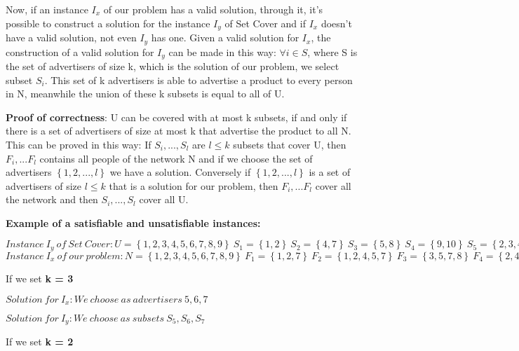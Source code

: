 \documentclass{article}
\begin{document}
Now, if an instance $I_{x}$ of our problem has a valid solution, through it, it's possible to construct a solution for the instance $I_{y}$ of Set Cover and if $I_{x}$ doesn't have a valid solution, not even $I_{y}$ has one.
Given a valid solution for  $I_{x}$, the construction of a valid solution for $I_{y}$ can be made in this way:
$\forall i\in S$, where S is the set of advertisers of size k, which is the solution of our problem, we select subset $S_{i}$. This set of k advertisers is able to advertise a product to every person in N, meanwhile the union of these k subsets is equal to all of U.

\textbf{Proof of correctness}:
U can be covered with at most k subsets, if and only if  there is a set of advertisers of size at most k that advertise the product to all N. This can be proved in this way: If $S_{i}, ... , S_{l}$ are $l \le k$ subsets that cover U, then $F_{i}, ... F_{l}$ contains all people of the network N and if we choose the set of advertisers  $\left \{1, 2, ..., l  \right \}$ we have a solution. Conversely if  $\left \{1, 2, ..., l  \right \}$ is a set of advertisers of size $ l \le k $ that is a solution for our problem, then $F_{i}, ... F_{l}$ cover all the network and then $S_{i}, ... , S_{l}$ cover all U.


\textbf{Example of a satisfiable and unsatisfiable instances:}

$Instance\ I_{y} \ of \ Set \ Cover:  
U = \left \{1,2,3,4,5,6,7,8,9  \right \} \ S_{1} = \left \{1,2 \right \} \ S_{2} = \left \{4,7 \right \} \ S_{3} = \left \{5,8 \right \} \ S_{4} = \left \{9,10 \right \} \ S_{5} = \left \{2,3,4,5 \right \} \ S_{6} = \left \{6,7,8,10 \right \} \ S_{7} = \left \{1,3,6,9 \right \}$
\\
$Instance\ I_{x} \ of \ our \ problem:  
N = \left \{1,2,3,4,5,6,7,8,9  \right \} \ F_{1} = \left \{1,2,7 \right \} \ F_{2} = \left \{1,2,4,5,7 \right \} \ F_{3} = \left \{3,5,7,8 \right \} \ F_{4} = \left \{2,4,5,9,10 \right \} \ F_{5} = \left \{2,3,4,5 \right \} \ F_{6} = \left \{6,7,8,10 \right \} \ F_{7} = \left \{1,2,3,6,7,9 \right \}  \ F_{8} = \left \{3,6,8 \right \} \ F_{9} = \left \{4,7,9 \right \}\ F_{10} = \left \{4,6,10 \right \}$


If we set \textbf{k = 3}


$Solution\ for\ I_{x}: We\ choose\ as\ advertisers\: 5,6,7$


$Solution\ for\ I_{y}: We\ choose\ as\ subsets\: S_{5}, S_{6}, S_{7}$


If we set \textbf{k = 2}
\end{document}
